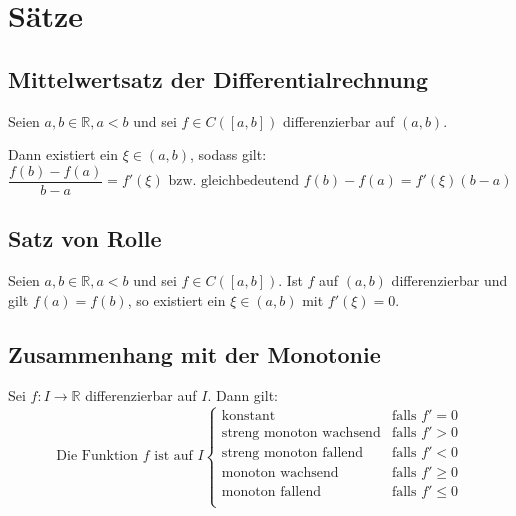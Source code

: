 \documentclass[a4paper, 11pt, accentcolor = tud3b]{tudreport}
\begin{document}
        \section{Sätze}
            \subsection{Mittelwertsatz der Differentialrechnung}
                Seien $ a, b \in \mathbb{R}, a < b $ und sei $ f \in C([a, b]) $ differenzierbar auf $ (a, b) $.

                Dann existiert ein $ \xi \in (a, b) $, sodass gilt:
                \begin{equation*}
                    \frac{f(b) - f(a)}{b - a} = f'(\xi) \text{ bzw. gleichbedeutend } f(b) - f(a) = f'(\xi)(b - a)
                \end{equation*}

            \subsection{Satz von Rolle}
                Seien $ a, b \in \mathbb{R}, a < b $ und sei $ f \in C([a, b]) $. Ist $ f $ auf $ (a, b) $ differenzierbar und gilt $ f(a) = f(b) $, so existiert ein $ \xi \in (a, b) $ mit $ f'(\xi) = 0 $.

            \subsection{Zusammenhang mit der Monotonie}
                Sei $ f : I \rightarrow \mathbb{R} $ differenzierbar auf $ I $. Dann gilt:
                \begin{equation*}
                    \text{Die Funktion } f \text{ ist auf } I
                    \begin{cases}
                        \text{konstant} & \text{falls } f' = 0 \\
                        \text{streng monoton wachsend} & \text{falls } f' > 0 \\
                        \text{streng monoton fallend} & \text{falls } f' < 0 \\
                        \text{monoton wachsend} & \text{falls } f' \geq 0 \\
                        \text{monoton fallend} & \text{falls } f' \leq 0 \\
                    \end{cases}
                \end{equation*}
\end{document}
